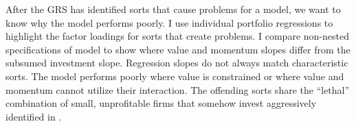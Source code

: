 After the GRS has identified sorts that cause problems for a model, we want to know why
the model performs poorly. I use individual portfolio regressions to highlight the factor
loadings for sorts that create problems. I compare non-nested specifications of model to
show where value and momentum slopes differ from the subsumed investment slope. Regression
slopes do not always match characteristic sorts. The model performs poorly where value is
constrained or where value and momentum cannot utilize their interaction. The offending
sorts share the “lethal” combination of small, unprofitable firms that somehow invest
aggressively identified in \textcite{fama2015five}.
